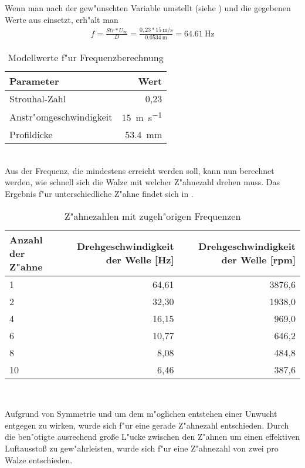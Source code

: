 Wenn man  nach der gew"unschten Variable umstellt (siehe ) und die gegebenen Werte aus  einsetzt, erh"alt man
\begin{align}
	{f}=\frac{Str*U_{\infty}}{D}
		=\frac{0,23*\SI{15}{\meter\per\second}}{\SI{0,0534}{\meter}}
		=\SI{64,61}{\hertz}
		\label{eq:nachfumgestellt}
\end{align}
\begin{table}[h!]
	\centering
	\begin{tabular}{lr}
		\toprule
		Parameter & Wert\\
		\midrule
		Strouhal-Zahl & 0,23\\
		Anstr"omgeschwindigkeit & \SI{15}{\meter\per\second}\\
		Profildicke & \SI{53,4}{\milli\meter}\\
		\bottomrule
	\end{tabular}
	\caption{Modellwerte f"ur Frequenzberechnung}
	\label{tab:Modellwerte}
\end{table}\\
Aus der Frequenz, die mindestens erreicht werden soll, kann nun berechnet werden, wie schnell sich die Walze mit welcher Z"ahnezahl drehen muss. Das Ergebnis f"ur unterschiedliche Z"ahne findet sich in .\\
\begin{table}[h]
	\centering
	\begin{tabular}{lrr}
		\toprule
		Anzahl der Z"ahne & Drehgeschwindigkeit der Welle [Hz] & Drehgeschwindigkeit der Welle [rpm]\\
		\midrule
		1 & 64,61 & 3876,6\\
		2 & 32,30 & 1938,0\\
		4 & 16,15 & 969,0\\
		6 & 10,77 & 646,2\\
		8 & 8,08 & 484,8\\
		10 & 6,46 & 387,6\\
		\bottomrule
	\end{tabular}\\
	\caption{Z"ahnezahlen mit zugeh"origen Frequenzen}
	\label{tab:zahnezahl}
\end{table}

Aufgrund von Symmetrie und um dem m"oglichen entstehen einer Unwucht entgegen zu wirken, wurde sich f"ur eine gerade Z"ahnezahl entschieden. Durch die ben"otigte ausrechend gro\ss{}e L"ucke zwischen den Z"ahnen um einen effektiven Luftaussto\ss{} zu gew"ahrleisten, wurde sich f"ur eine Z"ahnezahl von zwei pro Walze entschieden.\\

